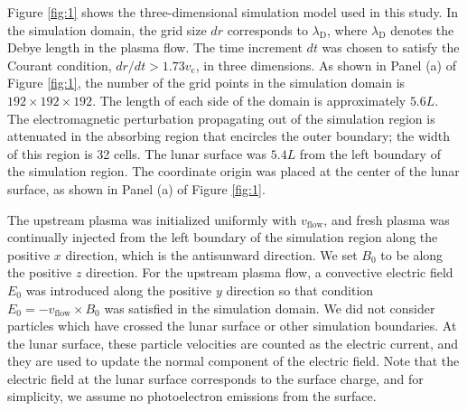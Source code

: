 \documentclass[draft,jgrga]{agutex2015}
\begin{document}
\begin{article}
Figure \ref{fig:1} shows the three-dimensional simulation model used in this study.
In the simulation domain, 
the grid size $dr$ corresponds to $\lambda_\mathrm{D}$, 
where $\lambda_\mathrm{D}$ denotes the Debye length in the plasma flow.
The time increment $dt$ was chosen to satisfy 
the Courant condition, $dr/dt > 1.73 v_\mathrm{c}$, in three dimensions. 
As shown in Panel (a) of Figure \ref{fig:1}, 
the number of the grid points in the simulation domain is $192 \times 192 \times 192$. 
The length of each side of the domain is approximately $5.6L$. 
The electromagnetic perturbation propagating out of the simulation region
is attenuated in the absorbing region that encircles the outer boundary; 
the width of this region is 32 cells.
The lunar surface was $5.4L$ 
from the left boundary of the simulation region.
The coordinate origin was placed at the center of the lunar surface, 
as shown in Panel (a) of Figure \ref{fig:1}.

The upstream plasma was initialized uniformly with $v_\mathrm{flow}$,
and fresh plasma was continually injected from the left boundary of 
the simulation region along the positive $x$ direction,
which is the antisunward direction.
We set $B_\mathrm{0}$ to be along the positive $z$ direction.
For the upstream plasma flow, a convective electric field $E_0$ was introduced along the positive $y$ direction 
so that condition $E_\mathrm{0} = -v_\mathrm{flow} \times B_\mathrm{0}$ 
was satisfied in the simulation domain. 
We did not consider particles which have crossed the lunar surface or other simulation boundaries. 
At the lunar surface, these particle velocities are counted as 
the electric current, and they are used to update the normal component
of the electric field. 
Note that the electric field at the lunar surface corresponds to the surface charge,
and for simplicity, we assume no photoelectron emissions from the surface. 


\end{article}
\end{document}
